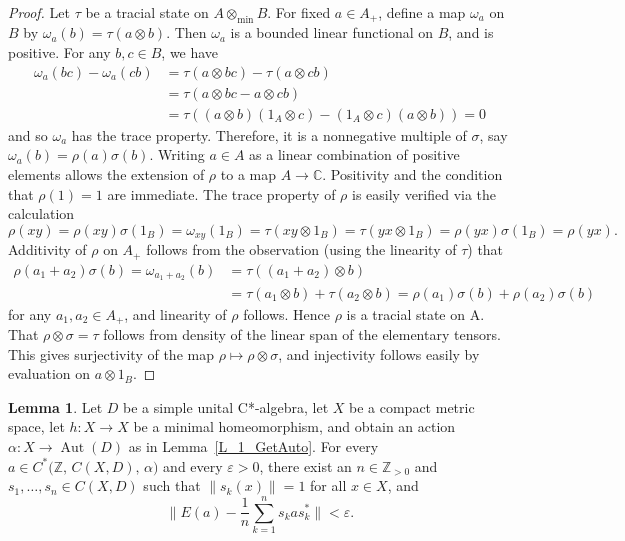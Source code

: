 \documentclass[10pt]{amsart}
\numberwithin{equation}{section}
\theoremstyle{definition}
\newtheorem{lem}[thm]{Lemma}
\newcommand{\af}{\alpha}
\newcommand{\ep}{\varepsilon}
\newcommand{\sm}{\sigma}
\newcommand{\om}{\omega}
\newcommand{\Z}{{\mathbb{Z}}}
\newcommand{\N}{{\mathbb{Z}}_{> 0}}
\newcommand{\Aut}{{\operatorname{Aut}}}
\begin{document}
\begin{proof}
Let $\tau$ be a tracial state on $A \otimes_{\min} B$.
For fixed $a \in A_{+}$, define a map $\om_{a}$ on
$B$ by $\om_{a} (b) = \tau (a \otimes b)$.
Then
$\om_{a}$ is a bounded linear functional on $B$,
and is positive.
For any $b,c \in B$, we have
%
\begin{align*}
\om_{a} (bc) - \om_{a}(cb) &= \tau (a \otimes bc) -
\tau (a \otimes cb) \\
&= \tau (a \otimes bc - a \otimes cb) \\
&= \tau ( (a \otimes b) (1_{A} \otimes c) -
(1_{A} \otimes c) (a \otimes b) ) = 0
\end{align*}
%
and so $\om_{a}$ has the trace property.
Therefore,
it is a nonnegative multiple of $\sm$, say
$\om_{a} (b) = \rho (a) \sm (b)$.
Writing
$a \in A$ as a linear combination of positive
elements allows the extension of $\rho$ to a map
$A \to {\mathbb{C}}$.
Positivity and the condition
that $\rho (1) = 1$ are immediate.
The trace
property of $\rho$ is easily verified via the
calculation
%
\[
\rho (xy) = \rho(xy) \sm (1_{B}) = \om_{xy}(1_{B})
= \tau (xy \otimes 1_{B}) = \tau (yx \otimes 1_{B})
= \rho (yx) \sm(1_{B}) = \rho (yx).
\]
%
Additivity of $\rho$ on $A_{+}$ follows from the
observation (using the linearity of $\tau$) that
%
\begin{align*}
\rho (a_{1} + a_{2}) \sm (b)
= \om_{a_{1} + a_{2}} (b)
&= \tau ((a_{1} + a_{2}) \otimes b) \\
&= \tau (a_{1} \otimes b) + \tau (a_{2} \otimes b)
= \rho (a_{1}) \sm (b) + \rho (a_{2}) \sm (b)
\end{align*}
%
for any $a_{1}, a_{2} \in A_{+}$, and linearity
of $\rho$ follows.
Hence $\rho$ is a tracial state
on A.
That $\rho \otimes \sm = \tau$ follows from
density of the linear span of the elementary tensors.
This gives surjectivity of the map
$\rho \mapsto \rho \otimes \sm$,
and injectivity follows easily by evaluation on
$a \otimes 1_{B}$.
\end{proof}

\begin{lem}\label{L_2_AveApprox}
Let $D$ be a simple unital C*-algebra, let $X$ be
a compact metric space, let $h \colon X \to X$ be
a minimal homeomorphism, and obtain an action
$\af \colon X \to \Aut (D)$ as in
Lemma~\ref{L_1_GetAuto}.
For every $a \in
C^* \bigl( \Z, \, C (X, D), \, \af \bigr)$ and every
$\ep > 0$, there exist an $n \in \N$ and
$s_1 , \ldots , s_n \in C (X,D)$ such that
$\lVert s_k (x) \rVert = 1$ for all $x \in X$, and
%
\[
\Big\lVert E(a) - \frac{1}{n}
\sum_{k=1}^{n} s_k a s_k^* \Big\rVert < \ep.
\]
%
\end{lem}
\end{document}
